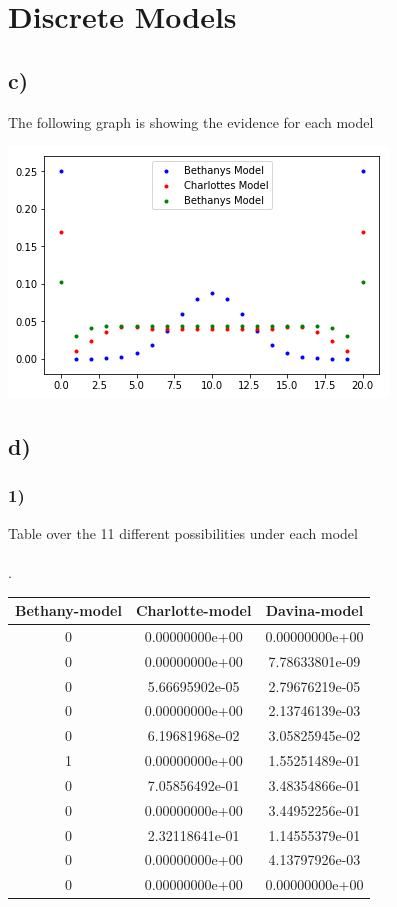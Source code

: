 \documentclass[12pt,twoside]{article}
\begin{document}
\section{Discrete Models}
\subsection*{c)} The following graph is showing the evidence for each model
\begin{center}
\includegraphics{../scatter}     
\end{center}

\subsection*{d)}
\subsubsection*{1)}
Table over the 11 different possibilities under each model \\ \\.
\begin{tabular}{|c|c|c|}
	\hline 
	Bethany-model & Charlotte-model & Davina-model \\ 
	\hline 
0	& 0.00000000e+00 & 0.00000000e+00 \\ 
	\hline 
0	& 0.00000000e+00 & 7.78633801e-09\\ 
	\hline 
0	&  5.66695902e-05 & 2.79676219e-05 \\ 
	\hline 
0	& 0.00000000e+00 & 2.13746139e-03 \\ 
	\hline 
0	& 6.19681968e-02 & 3.05825945e-02 \\ 
	\hline 
1	& 0.00000000e+00 & 1.55251489e-01 \\ 
	\hline 
0	& 7.05856492e-01 & 3.48354866e-01 \\ 
	\hline 
0	& 0.00000000e+00 & 3.44952256e-01 \\ 
	\hline 
0	& 2.32118641e-01 & 1.14555379e-01 \\ 
	\hline 
0	& 0.00000000e+00 & 4.13797926e-03 \\ 
	\hline 
0	& 0.00000000e+00 & 0.00000000e+00 \\ 
	\hline 
\end{tabular} 
\end{document}
